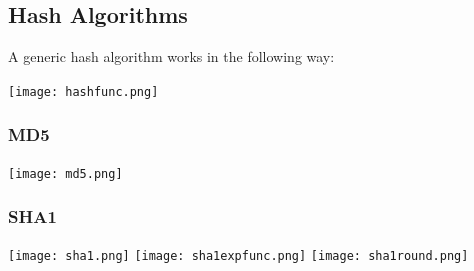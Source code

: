 \newpage
\subsection{Hash Algorithms}
A generic hash algorithm works in the following way:
\begin{center}
    \texttt{[image: hashfunc.png]}
\end{center}

\subsubsection{MD5}
\begin{center}
\texttt{[image: md5.png]}
    
\end{center}
\subsubsection{SHA1}
\begin{center}
    \texttt{[image: sha1.png]}    
\texttt{[image: sha1expfunc.png]}
\texttt{[image: sha1round.png]}
\end{center}


